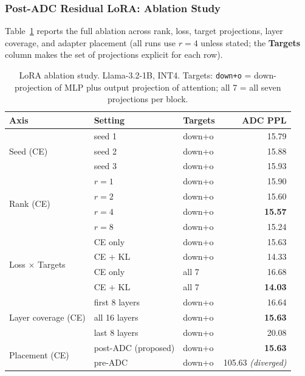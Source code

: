\documentclass[a4paper,11pt,oneside]{article}
\theoremstyle{breakstyle}
\begin{document}
  \subsubsection{Post-ADC Residual LoRA: Ablation Study}

  Table~\ref{tab:lorav7} reports the full ablation across rank, loss,
  target projections, layer coverage, and adapter placement (all runs
  use $r=4$ unless stated; the \textbf{Targets} column makes the
  set of projections explicit for each row).

  \begin{table}[htbp]
    \centering
    \caption{LoRA ablation study. Llama-3.2-1B, INT4. Targets:
      \texttt{down+o} = down-projection of MLP plus output projection
      of attention; all 7 = all seven projections per block.}
    \label{tab:lorav7}
    \renewcommand{\arraystretch}{1.15}
    \begin{tabular}{@{}l l l r@{}}
      \toprule
      \textbf{Axis} & \textbf{Setting} & \textbf{Targets} & \textbf{ADC PPL} \\
      \midrule
      \multirow{3}{*}{Seed (CE)}
        & seed 1 & down+o & 15.79 \\
        & seed 2 & down+o & 15.88 \\
        & seed 3 & down+o & 15.93 \\
      \midrule
      \multirow{4}{*}{Rank (CE)}
        & $r=1$ & down+o & 15.90 \\
        & $r=2$ & down+o & 15.60 \\
        & $r=4$ & down+o & \textbf{15.57} \\
        & $r=8$ & down+o & 15.24 \\
      \midrule
      \multirow{4}{*}{Loss $\times$ Targets}
        & CE only        & down+o & 15.63 \\
        & CE $+$ KL      & down+o & 14.33 \\
        & CE only        & all 7  & 16.68 \\
        & CE $+$ KL      & all 7  & \textbf{14.03} \\
      \midrule
      \multirow{3}{*}{Layer coverage (CE)}
        & first 8 layers & down+o & 16.64 \\
        & all 16 layers  & down+o & \textbf{15.63} \\
        & last 8 layers  & down+o & 20.08 \\
      \midrule
      \multirow{2}{*}{Placement (CE)}
        & post-ADC (proposed) & down+o & \textbf{15.63} \\
        & pre-ADC             & down+o & 105.63 \textit{(diverged)} \\
      \bottomrule
    \end{tabular}
  \end{table}
\end{document}
